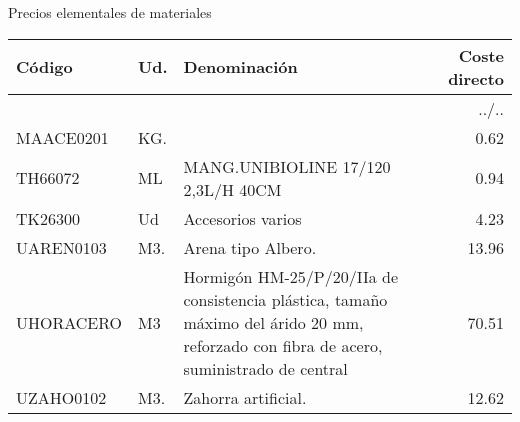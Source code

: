 \documentclass{book}%
\begin{document}
\normalsize%
\begin{center}
%
\Large%
 Precios elementales de materiales %
\normalsize%
\end{center}
%
\small%
\begin{longtable}{|l|l|p{4cm}|r|}%
\hline%
Código&Ud.&Denominación&Coste directo\\%
\hline%
\endhead%
\hline%
\multicolumn{4}{|r|}{../..}\\%
\hline%
\endfoot%
\hline%
\endlastfoot%
MAACE0201&KG.&&0.62\\%
TH66072&ML&MANG.UNIBIOLINE 17/120 2,3L/H 40CM&0.94\\%
TK26300&Ud&Accesorios varios&4.23\\%
UAREN0103&M3.&Arena tipo Albero.&13.96\\%
UHORACERO&M3&Hormigón HM{-}25/P/20/IIa de consistencia plástica, tamaño máximo del árido 20 mm, reforzado con fibra de acero, suministrado de central&70.51\\%
UZAHO0102&M3.&Zahorra artificial.&12.62\\%
\end{longtable}%
\normalsize

%
\end{document}
